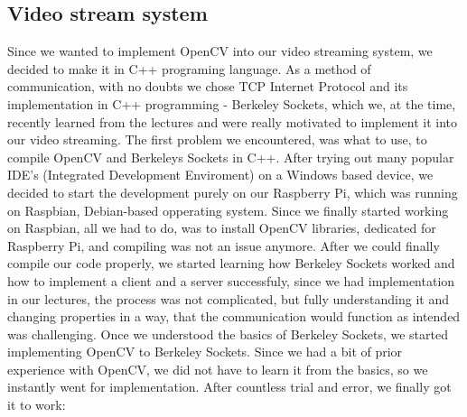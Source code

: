 \documentclass[conference]{IEEEtran}
\begin{document}
\subsection{Video stream system}
Since we wanted to implement OpenCV into our video streaming system, we decided to make it in C++ programing language. As a method of communication, with no doubts we chose TCP Internet Protocol and its implementation in C++ programming - Berkeley Sockets, which we, at the time, recently learned from the lectures and were really motivated to implement it into our video streaming.
\newline
The first problem we encountered, was what to use, to compile OpenCV and Berkeleys Sockets in C++. After trying out many popular IDE's (Integrated Development Enviroment) on a Windows based device, we decided to start the development purely on our Raspberry Pi, which was running on Raspbian, Debian-based opperating system. Since we finally started working on Raspbian, all we had to do, was to install OpenCV libraries, dedicated for Raspberry Pi, and compiling was not an issue anymore. After we could finally compile our code properly, we started learning how Berkeley Sockets worked and how to implement a client and a server successfuly, since we had implementation in our lectures, the process was not complicated, but fully understanding it and changing properties in a way, that the communication would function as intended was challenging. Once we understood the basics of Berkeley Sockets, we started implementing OpenCV to Berkeley Sockets. Since we had a bit of prior experience with OpenCV, we did not have to learn it from the basics, so we instantly went for implementation. After countless trial and error, we finally got it to work:
\end{document}
